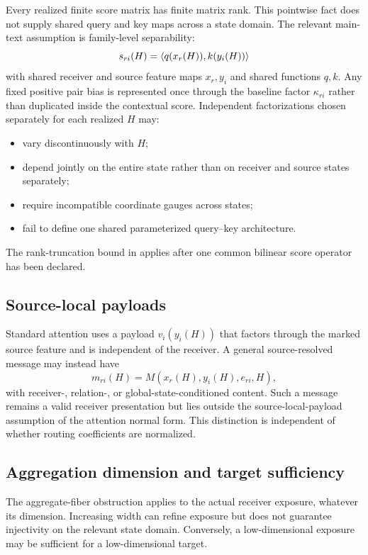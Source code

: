 Every realized finite score matrix has finite matrix rank. This pointwise fact does not supply shared query and key maps across a state domain. The relevant main-text assumption is family-level separability:
\[
s_{ri}(H)=\left\langle q(x_r(H)),k(y_i(H))\right\rangle
\]
with shared receiver and source feature maps $x_r,y_i$ and shared functions $q,k$. Any fixed positive pair bias is represented once through the baseline factor $\kappa_{ri}$ rather than duplicated inside the contextual score. Independent factorizations chosen separately for each realized $H$ may:
\begin{itemize}
\item vary discontinuously with $H$;
\item depend jointly on the entire state rather than on receiver and source states separately;
\item require incompatible coordinate gauges across states;
\item fail to define one shared parameterized query--key architecture.
\end{itemize}
The rank-truncation bound in  applies after one common bilinear score operator has been declared.

\subsection{Source-local payloads}

Standard attention uses a payload $v_i(y_i(H))$ that factors through the marked source feature and is independent of the receiver. A general source-resolved message may instead have
\[
m_{ri}(H)=M(x_r(H),y_i(H),e_{ri},H),
\]
with receiver-, relation-, or global-state-conditioned content. Such a message remains a valid receiver presentation but lies outside the source-local-payload assumption of the attention normal form. This distinction is independent of whether routing coefficients are normalized.

\subsection{Aggregation dimension and target sufficiency}

The aggregate-fiber obstruction applies to the actual receiver exposure, whatever its dimension. Increasing width can refine exposure but does not guarantee injectivity on the relevant state domain. Conversely, a low-dimensional exposure may be sufficient for a low-dimensional target.

